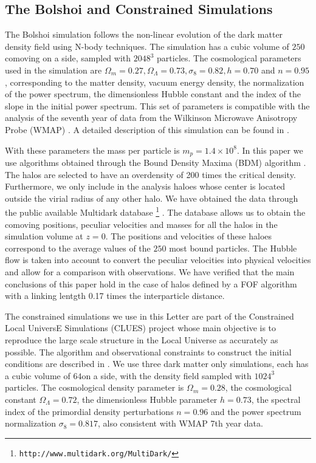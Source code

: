 \documentclass{emulateapj}
\newcommand{\hMpc}{{\ifmmode{h^{-1}{\rm Mpc}}\else{$h^{-1}$Mpc }\fi}}
\newcommand{\hMsun}{{\ifmmode{h^{-1}{\rm {M_{\odot}}}}\else{$h^{-1}{\rm{M_{\odot}}}$}\fi}}
\begin{document}
\subsection{The Bolshoi and Constrained Simulations}



The Bolshoi simulation follows the non-linear evolution of the dark matter density field using N-body techniques. The simulation has a cubic volume of $250$\hMpc comoving on a side, sampled with $2048^{3}$ particles. The cosmological parameters used in the simulation are $\Omega_{m}=0.27, \Omega_{\Lambda}=0.73, \sigma_{8}=0.82, h=0.70$ and $n=0.95$, corresponding to the matter density, vacuum energy density, the normalization of the power spectrum, the dimensionless Hubble constant and the index of the slope in the initial power spectrum. This set of parameters is compatible with the analysis  of the seventh year of data from the Wilkinson Microwave Anisotropy Probe (WMAP) \citep{Jarosik2011}. A detailed description of this simulation can be found in \citep{Bolshoi}.

With these parameters the mass per particle is $m_{p}=1.4\times 10^{8}$\hMsun. In this paper we use algorithms obtained through the Bound Density Maxima (BDM) algorithm \citep{KlypinBDM}. The halos are selected to have an overdensity of 200 times the critical density. Furthermore, we only include in the analysis haloes whose center is located outside the virial radius of any other halo.  We have obtained the data through the public available Multidark database \footnote{{\tt http://www.multidark.org/MultiDark/}} \citep{2011arXiv1109.0003R}. The database allows us to obtain the comoving positions, peculiar velocities and masses for all the halos in the simulation volume at $z=0$. The positions and velocities of these haloes correspond to the average values of the $250$ most bound particles. The Hubble flow is taken into account to convert the peculiar velocities into physical velocities and allow for a comparison with observations. We have verified that the main conclusions of this paper hold in the case of halos defined by a FOF algorithm with a linking lentgth 0.17 times the interparticle distance.

The constrained simulations we use in this Letter are part of the Constrained Local UniversE Simulations (CLUES) project whose main objective is to reproduce the large scale structure in the Local Universe as accurately as possible. The algorithm and observational constraints to construct the initial conditions are  described in \citep{clues2010}.  We use three dark matter only simulations, each has a cubic volume of $64$\hMpc on a side, with the density field sampled with $1024^3$ particles. The cosmological density parameter is $\Omega_m=0.28$, the cosmological constant $\Omega_{\Lambda}=0.72$, the dimensionless Hubble parameter $h=0.73$, the spectral index of the primordial density perturbations $n=0.96$ and the power spectrum normalization $\sigma_{8}=0.817$, also consistent with WMAP 7th year data. 
\end{document}
